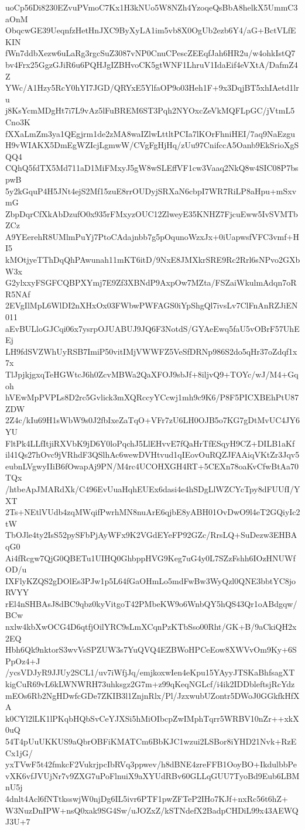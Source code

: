 uoCp56Di8230EZvuPVmoC7Kx1H3kNUo5W8NZh4YzoqeQsBbA8helkX5UmmC3aOnM
ObqcwGE39UeqnfzHetHnJXC9ByXyLA1im5vb8X0OgUb2ezb6Y4/aG+BctVLfEKIN
fWn7ddbXezw6uLaRg3rgcSuZ3087vNP0CnuCPescZEEqfJah6HR2u/w4ohkIstQ7
bv4Frx25GgzGJiR6u6PQHJgIZBHvoCK5gtWNF1LhruV1IdaEif4eVXtA/DafmZ4Z
YWc/A1Hzy5RcY0hYI7JGD/QRYxE5YlfaOP9o03Heh1F+9x3DqjBT5xhIAetd1lru
j8KsYcmMDgHt7i7L9vAz5lFuBREM6ST3Pqh2NYOxcZeVkMQFLpGC/jVtmL5Cno3K
fXXaLmZm3ya1QEgjrm1de2zMA8waIZlwLttltPCIa7lKOrFhniHEI/7aq9NaEzgu
H9vWIAKX5DmEgWZIcjLgmwW/CVgFgHjHq/zUu97CnifccA5Oanb9EkSrioXgSQQ4
CQhQ5fdTX5Md711aD1MiFMxyJ5gW8wSLEffVF1cw3Vaaq2NkQ8w4SIC08P7bspwB
5y2kGquP4H5JNt4ejS2Mf15zuE8rrOUDyjSRXaN6cbpI7WR7RiLP8aHpu+mSxvmG
ZbpDqrCfXkAbDzufO0x935rFMxyzOUC12ZlweyE35KNHZ7FjcuEww5IvSVMTbZCz
A9YEerehR8UMlmPuYj7PtoCAdajnbb7g5pOqunoWzxJx+0iUapwsfVFC3vmf+HI5
kMOtjyeTThDqQhPAwunah11mKT6itD/9NxE8JMXkrSRE9Rc2Rrl6sNPvo2GXbW3x
G2ylxxyFSGFCQBPXYmj7E9Zf3XBNdP9AxpOw7MZta/FSZaiWkulmAdqn7oRR5NAf
2EVgIlMpL6WlDI2nXHxOx03FWbwPWFAGS0iYpShgQl7ivsLv7ClFnAnRZJiEN011
aEvBULloGJCqi06x7ysrpOJUABUJ9JQ6F3NotdS/GYAeEwq5faU5vOBrF57UhEEj
LH9fdSVZWhUyRSB7ImiP50vitIMjVWWFZ5VeSfDRNp986S2do5qHr37oZdqf1x7x
TlJpjkjgxqTeHGWtcJ6h0ZcvMBWa2QaXFOJ9sbJf+8iljvQ9+TOYc/wJ/M4+Gqoh
hVEwMpPVPLs8D2rc5Gvlick3mXQRccyYCcwj1mh9c9K6/P8F5PICXBEhPtU87ZDW
2Z4c/kIu69H1sWbW9s0J2fbIxeZaTqO+VFr7zU6LH0OJB5o7KG7gDtMvUC4JY6YU
FltPk4LLfItjiRXVbK9jD6Y0loPqchJ5LlEHvvE7fQaHrTfESqyH9CZ+DILB1aKf
il41Qs27hOvc9jVRhdF3QSlhAc6wewDVHtvud1qIEovOuRQZJFAAiqVKtZr3Jqv5
eubnLVgwyIIiB6fOwapAj9PN/M4rc4UCOHXGH4RT+5CEXn78oaKvCfwBtAa70TQx
/htbeApJMARdXk/C496EvUuaHqhEUEx6dasi4e4hSDgLlWZCYcTpy8dFUUfI/YXT
2Ts+NEtlVUdb4zqMWqifPwrhMN8nuArE6qjbE8yABH01OvDwO9l4eT2GQiyIc2tW
TbOJle4ty2IsS52pySFbPjAyWFx9K2VGdEYeFP92GZc/RrsLQ+SuDezw3EHBAqG0
Ai4fRcgw7QjG0QBETu1UIHQ0GhbppHVG9Keg7uG4y0L7SZzFshh6IOzHNUWfOD/u
IXFlyKZQS2gDOlEs3PJw1p5L64fGaOHmLo5mdFwBw3WyQzl0QNE3bbtYC8joRVYY
rEl4nSHBAsJ8dBC9qbz0kyVitgoT42PMbeKW9o6WnbQY5hQS43Qr1oABdgqw/BCw
nxlw4kbXwOCG4D6qtfjOilYRC9sLmXCqnPzKTbSso00Rht/GK+B/9aCkiQH2x2EQ
Hbh6Qk9nktorS3wvVsSPZUW3s7YuQVQ4EZBWoHPCeEow8XWVvOm9Ky+6SPpOz4+J
/ycsVDJyR9JJUy2SCL1/uv7iWfjJq/emjkoxwIen4eKpu15YAyyJTSKaBhfsagXT
kigCuR69vL6kLWNWRH73uhksgz2G7m+z99qKeqNGLcf/i4ik2IDDbleftsjRcYdz
mEOs6Rb2NgHDwfcGDe7ZKIB3l1ZnjnRlx/Pl/JzxwubUZontr5DWoJ0GGkfkHfXA
k0CYl2lLK1lPKqbHQbSvCeYJXSi5hMiOIbcpZwIMphTqrr5WRBV10nZr++xkX0uQ
54T4pUuUKKUS9aQbrOBFiKMATCm6BbKJC1wzui2LSBor8iYHD21Nvk+RzECx1jG/
yxTVwF5t42fmkcF2VukrjpcIbRVq3ppwev/h8dBNE4zreFFB1OoyBO+IkdulbbPe
vXK6vfJVUjNr7v9ZXG7uPoFlnuiX9aXYUdRBv60GLLqGUU7TyoBd9Eub6LBMnU5j
4dnlt4Acl6fNTtksswjW0njDg6IL5ivr6PTF1pwZFTeP2IHo7KJf+nxRc56t6hZ+
W3NuzDnIPW+nsQ0xak9SG4Sw/uJOZxZ/kSTNdefX2BadpCHDiL99x43AEWQJ3U+7
